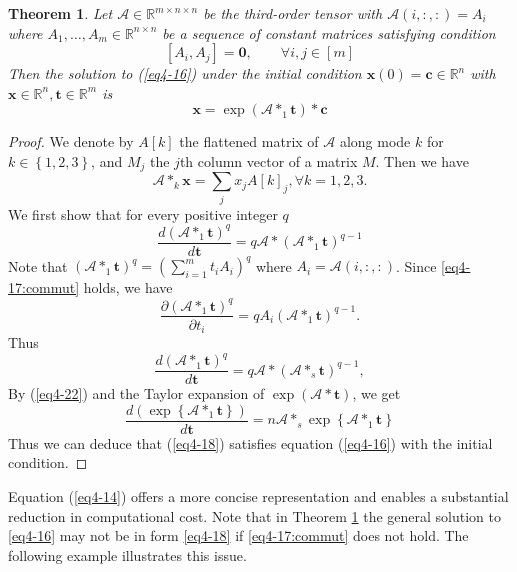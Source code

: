 \documentclass[11pt, oneside]{article}  %
\newtheorem{thm}{Theorem}[section]
\newcommand{\partl}{\partial}
\newcommand{\set}[1]{\left\{#1\right\}}
\newcommand{\RR}{\mathbb{R}}
\newcommand{\A}{\mathcal{A}}
\newcommand{\bft}{\textbf{t}}
\newcommand{\bx}{\textbf{x}}
\newcommand{\bfc}{\textbf{c}}
\newcommand{\beq}{\begin{equation}}
\newcommand{\eeq}{\end{equation}}
\begin{document}
\begin{thm}\label{th4-4}
Let $\A\in\RR^{m\times n\times n}$ be the third-order tensor with $\A(i,:,:) = A_{i}$ where $A_{1},\dots, A_{m}\in\RR^{n\times n}$ be a sequence 
of constant matrices satisfying condition 
\beq\label{eq4-17:commut}
[A_{i},A_{j}] = \mathbf{0}, \qquad   \forall  i,j\in [m]
\eeq
Then the solution to (\ref{eq4-16}) under the initial condition $\bx(0)=\bfc\in\RR^{n}$ with $\bx\in\RR^{n}, \bft\in\RR^{m}$ is 
\beq\label{eq4-18}
\bx = \exp (\A\ast_{1} \bft)\ast \bfc 
\eeq
\end{thm}
\begin{proof}
We denote by $A[k]$ the flattened matrix of $\A$ along mode $k$ for $k\in \set{1,2,3}$, and $M_{j}$ the $j$th column vector of a matrix $M$.
Then we have 
\beq\label{eq4-19-1} 
\A\ast_{k}\bx=\sum_{j} x_{j}A[k]_{j},  \forall k=1,2,3.  
\eeq
We first show that for every positive integer $q$
\beq\label{eq4-20}
\frac{d (\A\ast_{1} \bft)^{q}}{d \bft} = q \A\ast (\A\ast_{1} \bft)^{q-1} 
\eeq
Note that $(\A\ast_{1} \bft)^{q} = (\sum_{i=1}^{m }t_{i}A_{i})^{q}$ where $A_{i}=\A(i,:,:)$.  Since \eqref{eq4-17:commut} holds, we have 
\beq\label{eq4-21}
\frac{\partl (\A\ast_{1}\bft)^{q}}{\partl t_{i}} = q A_{i} (\A\ast_{1}\bft)^{q-1}. 
\eeq
Thus 
\beq\label{eq4-22}  
\frac{d (\A\ast_{1}\bft)^{q}}{d \bft} = q \A\ast (\A\ast_{s}\bft)^{q-1}, 
\eeq 
By (\ref{eq4-22}) and the Taylor expansion of $\exp(\A\ast \bft)$, we get 
\beq\label{eq4-23}  
\frac{d (\exp\set{\A\ast_{1}\bft})}{d \bft} = n \A\ast_{s} \exp\set{\A\ast_{1}\bft} 
\eeq 
Thus we can deduce that (\ref{eq4-18}) satisfies equation (\ref{eq4-16}) with the initial condition. 
\end{proof}

Equation (\ref{eq4-14}) offers a more concise representation and enables a substantial reduction in computational cost.  Note that in 
Theorem \ref{th4-4} the general solution to \eqref{eq4-16} may not be in form \eqref{eq4-18} if \eqref{eq4-17:commut} does not hold.  The following example illustrates this issue. 
\end{document}
